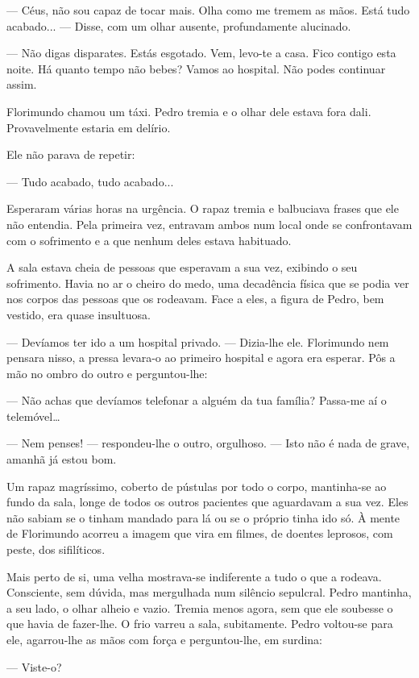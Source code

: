 --- Céus, não sou capaz de tocar mais. Olha como me tremem as mãos. Está
tudo acabado... --- Disse, com um olhar ausente, profundamente alucinado.

--- Não digas disparates. Estás esgotado. Vem, levo-te a casa. Fico
contigo esta noite. Há quanto tempo não bebes? Vamos ao hospital. Não
podes continuar assim.

Florimundo chamou um táxi. Pedro tremia e o olhar dele estava fora dali.
Provavelmente estaria em delírio.

Ele não parava de repetir:

--- Tudo acabado, tudo acabado...

Esperaram várias horas na urgência. O rapaz tremia e balbuciava frases
que ele não entendia. Pela primeira vez, entravam ambos num local onde
se confrontavam com o sofrimento e a que nenhum deles estava habituado.

A sala estava cheia de pessoas que esperavam a sua vez, exibindo o seu
sofrimento. Havia no ar o cheiro do medo, uma decadência física que se
podia ver nos corpos das pessoas que os rodeavam. Face a eles, a figura
de Pedro, bem vestido, era quase insultuosa.

--- Devíamos ter ido a um hospital privado. ---  Dizia-lhe ele. Florimundo
nem pensara nisso, a pressa levara-o ao primeiro hospital e agora era
esperar. Pôs a mão no ombro do outro e perguntou-lhe:

--- Não achas que devíamos telefonar a alguém da tua família? Passa-me aí
o telemóvel\ldots{}

--- Nem penses! ---  respondeu-lhe o outro, orgulhoso. ---  Isto não é nada de
grave, amanhã já estou bom.

Um rapaz magríssimo, coberto de pústulas por todo o corpo, mantinha-se
ao fundo da sala, longe de todos os outros pacientes que aguardavam a
sua vez. Eles não sabiam se o tinham mandado para lá ou se o próprio
tinha ido só. À mente de Florimundo acorreu a imagem que vira em filmes,
de doentes leprosos, com peste, dos sifilíticos.

Mais perto de si, uma velha mostrava-se indiferente a tudo o que a
rodeava. Consciente, sem dúvida, mas mergulhada num silêncio sepulcral.
Pedro mantinha, a seu lado, o olhar alheio e vazio. Tremia menos agora,
sem que ele soubesse o que havia de fazer-lhe. O frio varreu a sala,
subitamente. Pedro voltou-se para ele, agarrou-lhe as mãos com força e
perguntou-lhe, em surdina:

--- Viste-o?

